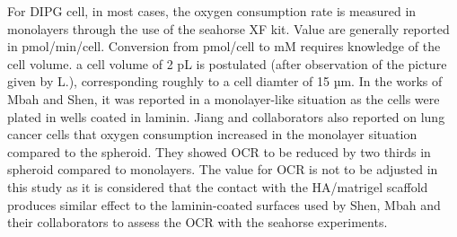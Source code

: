 \documentclass[11pt,a4paper]{article}
\begin{document}

For DIPG cell, in most cases, the oxygen consumption rate is measured in monolayers through the use of the seahorse XF kit.\cite{RomeroAgilent} Value are generally reported in pmol/min/cell. Conversion from pmol/cell to mM requires knowledge of the cell volume. a cell volume of 2 pL is postulated (after observation of the picture given by L.), corresponding roughly to a cell diamter of 15 µm. In the works of Mbah and Shen, it was reported in a monolayer-like situation as the cells were plated in wells coated in laminin.  Jiang and collaborators also reported on lung cancer cells that oxygen consumption increased in the monolayer situation compared to the spheroid. They showed OCR to be reduced by two thirds in spheroid compared to monolayers.\cite{Jiang2016} The value for OCR is not to be adjusted in this study as it is considered that the contact with the HA/matrigel scaffold produces similar effect to the laminin-coated surfaces used by Shen, Mbah and their collaborators to assess the OCR with the seahorse experiments.\\
\end{document}
